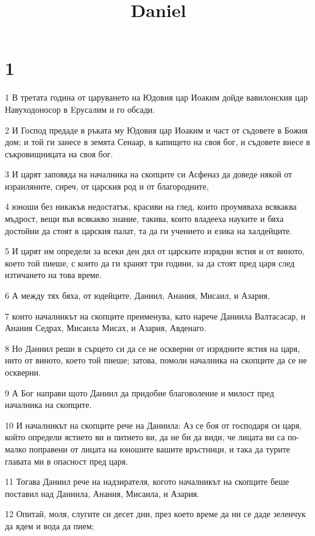 

\title{Daniel}


\chapter{1}

\par 1 В третата година от царуването на Юдовия цар Иоаким дойде вавилонския цар Навуходоносор в Eрусалим и го обсади.
\par 2 И Господ предаде в ръката му Юдовия цар Иоаким и част от съдовете в Божия дом; и той ги занесе в земята Сенаар, в капището на своя бог, и съдовете внесе в съкровищницата на своя бог.
\par 3 И царят заповяда на началника на скопците си Асфеназ да доведе някой от израиляните, сиреч, от царския род и от благородните,
\par 4 юноши без никакъв недостатък, красиви на глед, които проумяваха всякаква мъдрост, вещи във всякакво знание, такива, които владееха науките и бяха достойни да стоят в царския палат, та да ги учението и езика на халдейците.
\par 5 И царят им определи за всеки ден дял от царските изрядни ястия и от виното, което той пиеше, с които да ги хранят три години, за да стоят пред царя след изтичането на това време.
\par 6 А между тях бяха, от юдейците, Даниил, Анания, Мисаил, и Азария,
\par 7 които началникът на скопците преименува, като нарече Даниила Валтасасар, и Анания Седрах, Мисаила Мисах, и Азария, Авденаго.
\par 8 Но Даниил реши в сърцето си да се не оскверни от изрядните ястия на царя, нито от виното, което той пиеше; затова, помоли началника на скопците да се не оскверни.
\par 9 А Бог направи щото Даниил да придобие благоволение и милост пред началника на скопците.
\par 10 И началникът на скопците рече на Даниила: Аз се боя от господаря си царя, който определи ястието ви и питието ви, да не би да види, че лицата ви са по-малко поправени от лицата на юношите вашите връстници, и така да турите главата ми в опасност пред царя.
\par 11 Тогава Даниил рече на надзирателя, когото началникът на скопците беше поставил над Даниила, Анания, Мисаила, и Азария.
\par 12 Опитай, моля, слугите си десет дни, през което време да ни се даде зеленчук да ядем и вода да пием;
